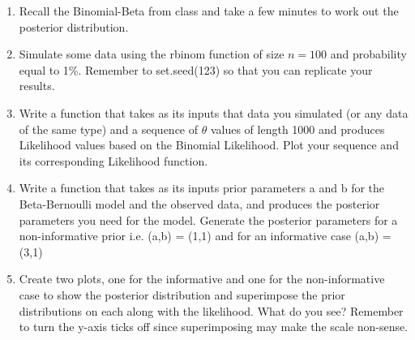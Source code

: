 \documentclass{article}
\begin{document}
\begin{enumerate}
\item Recall the Binomial-Beta from class and take a few minutes to work out the posterior distribution. 
\item{Simulate some data using the \textsf{rbinom} function of size $n = 100$ and probability equal to 1\%. Remember to \textsf{set.seed(123)} so that you can replicate your results.}
\item{Write a function that takes as its inputs that data you simulated (or any data of the same type) and a sequence of $\theta$ values of length 1000 and produces Likelihood values based on the Binomial Likelihood. Plot your sequence and its corresponding Likelihood function.}
\item{Write a function that takes as its inputs  prior parameters \textsf{a} and \textsf{b} for the Beta-Bernoulli model and the observed data, and produces the posterior parameters you need for the model. Generate the posterior parameters for a non-informative prior i.e. \textsf{(a,b) = (1,1)} and for an informative case \textsf{(a,b) = (3,1)}}
\item{Create two plots, one for the informative and one for the non-informative case to show the posterior distribution and superimpose the prior distributions on each along with the likelihood. What do you see? Remember to turn the y-axis ticks off since superimposing may make the scale non-sense.}
\end{enumerate}
\end{document}
